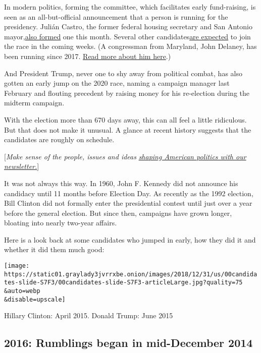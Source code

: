 In modern politics, forming the committee, which facilitates early
fund-raising, is seen as an all-but-official announcement that a person
is running for the presidency. Julián Castro, the former federal housing
secretary and San Antonio
mayor,\href{https://www.nytimes3xbfgragh.onion/2018/12/12/us/politics/julian-castro-president-democrat-texas.html}{also
formed} one this month. Several other
candidates\href{https://www.nytimes3xbfgragh.onion/2018/12/29/us/politics/2020-democratic-candidates-kamala-elizabeth-warren.html}{are
expected} to join the race in the coming weeks. (A congressman from
Maryland, John Delaney, has been running since 2017.
\href{https://www.nytimes3xbfgragh.onion/2018/11/10/us/politics/john-delaney-2020-iowa.html}{Read
more about him here}.)

And President Trump, never one to shy away from political combat, has
also gotten an early jump on the 2020 race, naming a campaign manager
last February and flouting precedent by raising money for his
re-election during the midterm campaign.

With the election more than 670 days away, this can all feel a little
ridiculous. But that does not make it unusual. A glance at recent
history suggests that the candidates are roughly on schedule.

{[}\emph{Make sense of the people, issues and ideas}
\href{https://www.nytimes3xbfgragh.onion/newsletters/politics?smid=rd?action=click\&module=Intentional\&pgtype=Article}{\emph{shaping
American politics with our newsletter.}}{]}

It was not always this way. In 1960, John F. Kennedy did not announce
his candidacy until 11 months before Election Day. As recently as the
1992 election, Bill Clinton did not formally enter the presidential
contest until just over a year before the general election. But since
then, campaigns have grown longer, bloating into nearly two-year
affairs.

Here is a look back at some candidates who jumped in early, how they did
it and whether it did them much good:

\texttt{[image: https://static01.graylady3jvrrxbe.onion/images/2018/12/31/us/00candidates-slide-S7F3/00candidates-slide-S7F3-articleLarge.jpg?quality=75\\\&auto=webp\\\&disable=upscale]}

Hillary Clinton: April 2015. Donald Trump: June 2015

\hypertarget{2016-rumblings-began-in-mid-december-2014}{%
\subsection{2016: Rumblings began in mid-December
2014}\label{2016-rumblings-began-in-mid-december-2014}}

